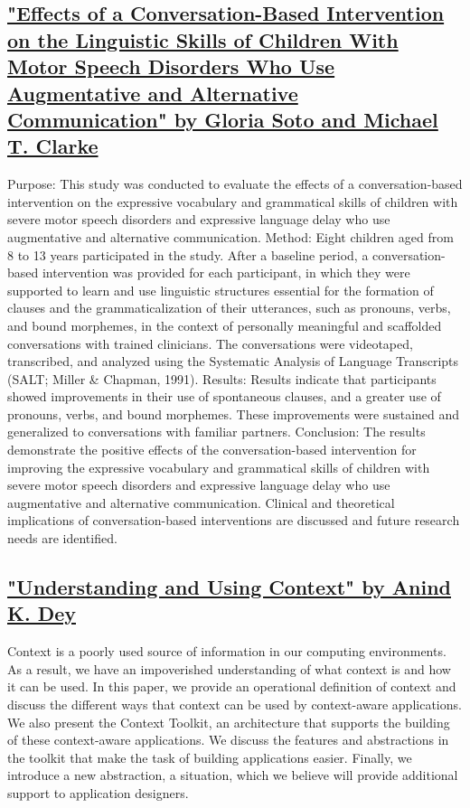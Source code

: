 \documentclass[sigchi]{acmart}
\begin{document}
		\subsection{\href{http://search.ebscohost.com.spot.lib.auburn.edu/login.aspx?direct=true&db=aph&AN=124123725&site=ehost-live}{"Effects of a Conversation-Based Intervention on the Linguistic Skills of Children With Motor Speech Disorders Who Use Augmentative and Alternative Communication" by Gloria Soto and Michael T. Clarke}}
			Purpose: This study was conducted to evaluate the effects of a conversation-based intervention on the expressive vocabulary and grammatical skills of children with severe motor speech disorders and expressive language delay who use augmentative and alternative communication. Method: Eight children aged from 8 to 13 years participated in the study. After a baseline period, a conversation-based intervention was provided for each participant, in which they were supported to learn and use linguistic structures essential for the formation of clauses and the grammaticalization of their utterances, such as pronouns, verbs, and bound morphemes, in the context of personally meaningful and scaffolded conversations with trained clinicians. The conversations were videotaped, transcribed, and analyzed using the Systematic Analysis of Language Transcripts (SALT; Miller \& Chapman, 1991). Results: Results indicate that participants showed improvements in their use of spontaneous clauses, and a greater use of pronouns, verbs, and bound morphemes. These improvements were sustained and generalized to conversations with familiar partners. Conclusion: The results demonstrate the positive effects of the conversation-based intervention for improving the expressive vocabulary and grammatical skills of children with severe motor speech disorders and expressive language delay who use augmentative and alternative communication. Clinical and theoretical implications of conversation-based interventions are discussed and future research needs are identified.
		\subsection{\href{http://citeseer.ist.psu.edu/viewdoc/download?doi=10.1.1.31.9786&rep=rep1&type=pdf}{"Understanding and Using Context" by Anind K. Dey}}
			Context is a poorly used source of information in our computing environments. As a result, we have an impoverished understanding of what context is and how it can be used. In this paper, we provide an operational definition of context and discuss the different ways that context can be used by context-aware applications. We also present the Context Toolkit, an architecture that supports the building of these context-aware applications. We discuss the features and abstractions in the toolkit that make the task of building applications easier. Finally, we introduce a new abstraction, a situation, which we believe will provide additional support to application designers.
\end{document}
